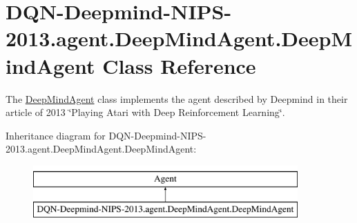 \hypertarget{classDQN-Deepmind-NIPS-2013_1_1agent_1_1DeepMindAgent_1_1DeepMindAgent}{}\section{D\+Q\+N-\/\+Deepmind-\/\+N\+I\+P\+S-\/2013.agent.\+Deep\+Mind\+Agent.\+Deep\+Mind\+Agent Class Reference}
\label{classDQN-Deepmind-NIPS-2013_1_1agent_1_1DeepMindAgent_1_1DeepMindAgent}


The \hyperlink{classDQN-Deepmind-NIPS-2013_1_1agent_1_1DeepMindAgent_1_1DeepMindAgent}{Deep\+Mind\+Agent} class implements the agent described by Deepmind in their article of 2013 \char`\"{}\+Playing Atari with Deep Reinforcement Learning\char`\"{}.  


Inheritance diagram for D\+Q\+N-\/\+Deepmind-\/\+N\+I\+P\+S-\/2013.agent.\+Deep\+Mind\+Agent.\+Deep\+Mind\+Agent\+:\begin{figure}[H]
\begin{center}
\leavevmode
\includegraphics[height=2.000000cm]{classDQN-Deepmind-NIPS-2013_1_1agent_1_1DeepMindAgent_1_1DeepMindAgent}
\end{center}
\end{figure}
